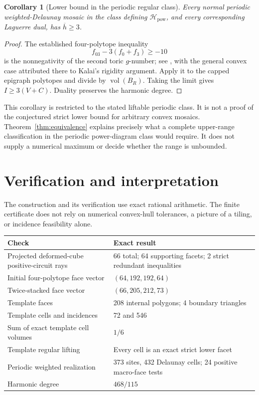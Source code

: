 \documentclass[11pt,a4paper]{article}
\newtheorem{corollary}[theorem]{Corollary}
\theoremstyle{definition}\newtheorem{definition}[theorem]{Definition}
\theoremstyle{remark}\newtheorem{remark}[theorem]{Remark}
\newcommand{\hbarM}{\overline h}\newcommand{\nbar}{\overline n}\newcommand{\vbar}{\overline v}
\begin{document}
\begin{corollary}[Lower bound in the periodic regular class]\label{cor:lower}
Every normal periodic weighted-Delaunay mosaic in the class defining \(\mathcal H_{\mathrm{pow}}\), and every corresponding Laguerre dual, has \(\hbarM\ge3\).
\end{corollary}
\begin{proof}
The established four-polytope inequality
\[
 f_{03}-3(f_0+f_3)\ge-10
\]
is the nonnegativity of the second toric \(g\)-number; see \citet[Section 4]{Z02}, with the general convex case attributed there to Kalai's rigidity argument. Apply it to the capped epigraph polytopes and divide by \(\operatorname{vol}(B_R)\). Taking the limit gives \(I\ge3(V+C)\). Duality preserves the harmonic degree.
\end{proof}

This corollary is restricted to the stated liftable periodic class. It is not a proof of the conjectured strict lower bound for arbitrary convex mosaics. Theorem~\ref{thm:equivalence} explains precisely what a complete upper-range classification in the periodic power-diagram class would require. It does not supply a numerical maximum or decide whether the range is unbounded.

\section{Verification and interpretation}\label{sec:verification}
The construction and its verification use exact rational arithmetic. The finite certificate does not rely on numerical convex-hull tolerances, a picture of a tiling, or incidence feasibility alone.

\begin{center}
\begin{tabular}{p{}p{}}
\toprule
Check & Exact result\\
\midrule
Projected deformed-cube positive-circuit rays &66 total; 64 supporting facets; 2 strict redundant inequalities\\
Initial four-polytope face vector &\((64,192,192,64)\)\\
Twice-stacked face vector &\((66,205,212,73)\)\\
Template faces &208 internal polygons; 4 boundary triangles\\
Template cells and incidences &72 and 546\\
Sum of exact template cell volumes &\(1/6\)\\
Template regular lifting &Every cell is an exact strict lower facet\\
Periodic weighted realization &373 sites, 432 Delaunay cells; 24 positive macro-face tests\\
Harmonic degree &\(468/115\)\\
\bottomrule
\end{tabular}
\end{center}
\end{document}
